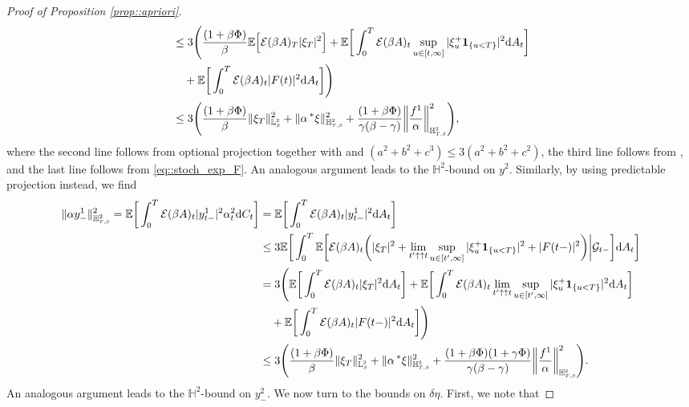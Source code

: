 \documentclass[10pt]{article} %
\newcommand\cE{\mathcal E}
\newcommand\cG{\mathcal G}
\newcommand{\smalltext}[1]{\text{\fontsize{4}{4}\selectfont$#1$}}
\def \E{\mathbb{E}}
\def \H{\mathbb{H}}
\def \L{\mathbb{L}}
\newcommand{\brs}[1]{\prescript{\ast}{}{#1}}
\def\d{\mathrm{d}}
\begin{document}
\begin{proof}[Proof of Proposition \ref{prop::apriori}]
\begin{align*}
	&\leq 3\Bigg(\frac{(1+\beta\Phi)}{\beta}\E \Big[ \cE(\beta A)_T|\xi_T|^2 \Big] + \E \bigg[ \int_0^T \cE(\beta A)_t \sup_{u \in [t,\infty]}|\xi^+_u \mathbf{1}_{\{u < T\}}|^2 \d A_t \bigg] \\
	&\quad+ \E \bigg[ \int_0^T \cE(\beta A)_t |F(t)|^2 \d A_t \bigg] \Bigg) \\
	&\leq 3 \Bigg( \frac{(1+\beta\Phi)}{\beta} \|\xi_T\|^2_{\L^\smalltext{2}_\smalltext{\beta}} + \|\alpha\brs{\xi}\|^2_{\H^\smalltext{2}_{\smalltext{T}\smalltext{,}\smalltext{\beta}}} +  \frac{(1+\beta\Phi)}{\gamma(\beta - \gamma)} \bigg\| \frac{f^1}{\alpha} \bigg\|^2_{\H^{\smalltext{2}}_{\smalltext{T}\smalltext{,}\smalltext{\beta}}} \Bigg),
\end{align*}
where the second line follows from optional projection together with  and $(a^2+b^2+c^3) \leq 3(a^2+b^2+c^2)$, the third line follows from \cite[Theorem VI.57]{dellacherie1982probabilities}, and the last line follows from \eqref{eq::stoch_exp_F}.
An analogous argument leads to the $\H^2$-bound on $y^2$. Similarly, by using predictable projection instead, we find
\begin{align*}
	\|\alpha y^1_-\|^2_{\H^2_{\smalltext{T}\smalltext{,}\smalltext{\beta}}} = \E \bigg[ \int_0^T \cE(\beta A)_t |y^1_{t-}|^2 \alpha^2_t \d C_t \bigg] 
	&= \E \bigg[ \int_0^T \cE(\beta A)_t |y^1_{t-}|^2 \d A_t \bigg] \\
	&\leq 3\E\bigg[ \int_0^T \E \bigg[\cE(\beta A)_t\bigg(|\xi_T|^2 +\lim_{t^\prime \uparrow\uparrow t}\sup_{u \in [t^\prime,\infty]}|\xi^+_u \mathbf{1}_{\{u < T\}}|^2 +  |F(t-)|^2\bigg) \bigg| \cG_{t-} \bigg] \d A_t \bigg] \\
	&= 3\Bigg(\E \bigg[ \int_0^T \cE(\beta A)_t |\xi_T|^2 \d A_t \bigg] + \E \bigg[ \int_0^T \cE(\beta A)_t \lim_{t^\prime \uparrow\uparrow t}\sup_{u \in [t^\prime,\infty]}|\xi^+_u \mathbf{1}_{\{u < T\}}|^2 \d A_t \bigg] \\
	&\quad+ \E \bigg[ \int_0^T \cE(\beta A)_t |F(t-)|^2 \d A_t \bigg] \Bigg) \\
	&\leq 3 \Bigg( \frac{(1+\beta\Phi)}{\beta} \|\xi_T\|^2_{\L^\smalltext{2}_\smalltext{\beta}} + \|\alpha\brs{\xi}\|^2_{\H^\smalltext{2}_{\smalltext{T}\smalltext{,}\smalltext{\beta}}} +  \frac{(1+\beta\Phi)(1+\gamma\Phi)}{\gamma(\beta-\gamma)} \bigg\| \frac{f^1}{\alpha} \bigg\|^2_{\H^{\smalltext{2}}_{\smalltext{T}\smalltext{,}\smalltext{\beta}}} \Bigg).
\end{align*}
An analogous argument leads to the $\H^2$-bound on $y^2_-$. We now turn to the bounds on $\delta\eta$. First, we note that

\end{proof}
\end{document}
